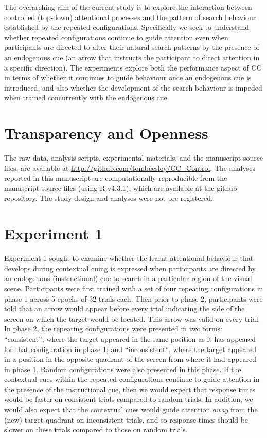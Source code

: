 \documentclass[
  man,floatsintext]{apa7}
\begin{document}
The overarching aim of the current study is to explore the interaction between controlled (top-down) attentional processes and the pattern of search behaviour established by the repeated configurations. Specifically we seek to understand whether repeated configurations continue to guide attention even when participants are directed to alter their natural search patterns by the presence of an endogenous cue (an arrow that instructs the participant to direct attention in a specific direction). The experiments explore both the performance aspect of CC in terms of whether it continues to guide behaviour once an endogenous cue is introduced, and also whether the development of the search behaviour is impeded when trained concurrently with the endogenous cue.

\hypertarget{transparency-and-openness}{%
\section{Transparency and Openness}\label{transparency-and-openness}}

The raw data, analysis scripts, experimental materials, and the manuscript source files, are available at \url{http://github.com/tombeesley/CC_Control}. The analyses reported in this manuscript are computationally reproducible from the manuscript source files (using R v4.3.1), which are available at the github repository. The study design and analyses were not pre-registered.

\hypertarget{experiment-1}{%
\section{Experiment 1}\label{experiment-1}}

Experiment 1 sought to examine whether the learnt attentional behaviour that develops during contextual cuing is expressed when participants are directed by an endogenous (instructional) cue to search in a particular region of the visual scene. Participants were first trained with a set of four repeating configurations in phase 1 across 5 epochs of 32 trials each. Then prior to phase 2, participants were told that an arrow would appear before every trial indicating the side of the screen on which the target would be located. This arrow was valid on every trial. In phase 2, the repeating configurations were presented in two forms: ``consistent'', where the target appeared in the same position as it has appeared for that configuration in phase 1; and ``inconsistent'', where the target appeared in a position in the opposite quadrant of the screen from where it had appeared in phase 1. Random configurations were also presented in this phase. If the contextual cues within the repeated configurations continue to guide attention in the presence of the instructional cue, then we would expect that response times would be faster on consistent trials compared to random trials. In addition, we would also expect that the contextual cues would guide attention \emph{away} from the (new) target quadrant on inconsistent trials, and so response times should be slower on these trials compared to those on random trials.
\end{document}
